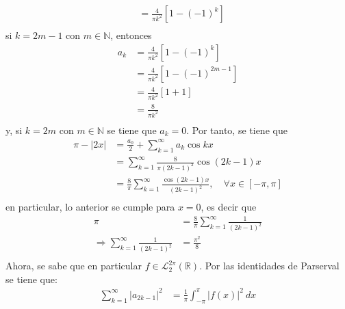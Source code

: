 \documentclass[12pt]{report}
\theoremstyle{largebreak}
\newcommand\abs[1]{\ensuremath{\left|#1\right|}}
\begin{document}
\begin{sol}
\begin{equation*}
\begin{split}
                &=\frac{4}{\pi k^2}\left[1-(-1)^k \right]\\
            \end{split}
        \end{equation*}
        si $k=2m-1$ con $m\in\mathbb{N}$, entonces
        \begin{equation*}
            \begin{split}
                a_k&=\frac{4}{\pi k^2}\left[1-(-1)^k\right]\\
                &=\frac{4}{\pi k^2}\left[1-(-1)^{2m-1}\right]\\
                &=\frac{4}{\pi k^2}\left[1+1 \right]\\
                &=\frac{8}{\pi k^2}\\
            \end{split}
        \end{equation*}
        y, si $k=2m$ con $m\in\mathbb{N}$ se tiene que $a_k=0$. Por tanto, se tiene que
        \begin{equation*}
            \begin{split}
                \pi-\abs{2x}&=\frac{a_0}{2}+\sum_{ k=1}^\infty a_k\cos kx\\
                &=\sum_{ k=1}^\infty \frac{8}{\pi (2k-1)^2}\cos (2k-1)x\\
                &=\frac{8}{\pi}\sum_{ k=1}^\infty\frac{\cos (2k-1)x}{(2k-1)^2},\quad\forall x\in[-\pi,\pi] \\
            \end{split}
        \end{equation*}
        en particular, lo anterior se cumple para $x=0$, es decir que
        \begin{equation*}
            \begin{split}
                \pi&=\frac{8}{\pi}\sum_{ k=1}^\infty\frac{1}{(2k-1)^2}\\
                \Rightarrow \sum_{ k=1}^\infty\frac{1}{(2k-1)^2}&=\frac{\pi^2}{8}\\
            \end{split}
        \end{equation*}
        Ahora, se sabe que en particular $f\in\mathcal{L}_2^{2\pi}(\mathbb{R})$. Por las identidades de Parserval se tiene que:
        \begin{equation*}
            \begin{split}
                \sum_{ k=1}^\infty\abs{a_{2k-1}}^2&=\frac{1}{\pi}\int_{-\pi}^\pi\abs{f(x)}^2\:dx\\

\end{split}
\end{equation*}
\end{sol}
\end{document}
